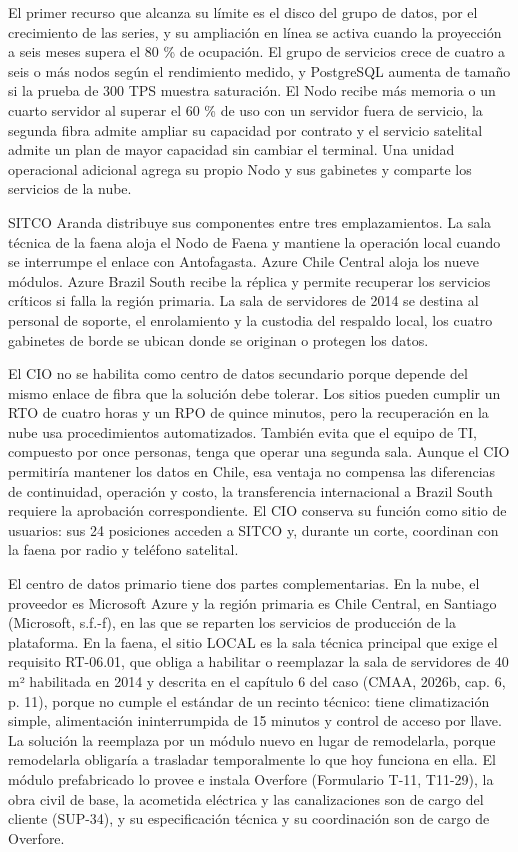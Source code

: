 \documentclass[subdoc]{../../comun/overfore}
\begin{document}
El primer recurso que alcanza su límite es el disco del grupo de datos, por el crecimiento de las series, y su ampliación en línea se activa cuando la proyección a seis meses supera el 80 \% de ocupación. El grupo de servicios crece de cuatro a seis o más nodos según el rendimiento medido, y PostgreSQL aumenta de tamaño si la prueba de 300 TPS muestra saturación. El Nodo recibe más memoria o un cuarto servidor al superar el 60 \% de uso con un servidor fuera de servicio, la segunda fibra admite ampliar su capacidad por contrato y el servicio satelital admite un plan de mayor capacidad sin cambiar el terminal. Una unidad operacional adicional agrega su propio Nodo y sus gabinetes y comparte los servicios de la nube.

SITCO Aranda distribuye sus componentes entre tres emplazamientos. La sala técnica de la faena aloja el Nodo de Faena y mantiene la operación local cuando se interrumpe el enlace con Antofagasta. Azure Chile Central aloja los nueve módulos. Azure Brazil South recibe la réplica y permite recuperar los servicios críticos si falla la región primaria. La sala de servidores de 2014 se destina al personal de soporte, el enrolamiento y la custodia del respaldo local, los cuatro gabinetes de borde se ubican donde se originan o protegen los datos.

El CIO no se habilita como centro de datos secundario porque depende del mismo enlace de fibra que la solución debe tolerar. Los sitios pueden cumplir un RTO de cuatro horas y un RPO de quince minutos, pero la recuperación en la nube usa procedimientos automatizados. También evita que el equipo de TI, compuesto por once personas, tenga que operar una segunda sala. Aunque el CIO permitiría mantener los datos en Chile, esa ventaja no compensa las diferencias de continuidad, operación y costo, la transferencia internacional a Brazil South requiere la aprobación correspondiente. El CIO conserva su función como sitio de usuarios: sus 24 posiciones acceden a SITCO y, durante un corte, coordinan con la faena por radio y teléfono satelital.

El centro de datos primario tiene dos partes complementarias. En la nube, el proveedor es Microsoft Azure y la región primaria es Chile Central, en Santiago (Microsoft, s.f.-f), en las que se reparten los servicios de producción de la plataforma. En la faena, el sitio LOCAL es la sala técnica principal que exige el requisito RT-06.01, que obliga a habilitar o reemplazar la sala de servidores de 40 m² habilitada en 2014 y descrita en el capítulo 6 del caso (CMAA, 2026b, cap. 6, p. 11), porque no cumple el estándar de un recinto técnico: tiene climatización simple, alimentación ininterrumpida de 15 minutos y control de acceso por llave. La solución la reemplaza por un módulo nuevo en lugar de remodelarla, porque remodelarla obligaría a trasladar temporalmente lo que hoy funciona en ella. El módulo prefabricado lo provee e instala Overfore (Formulario T-11, T11-29), la obra civil de base, la acometida eléctrica y las canalizaciones son de cargo del cliente (SUP-34), y su especificación técnica y su coordinación son de cargo de Overfore.
\end{document}
